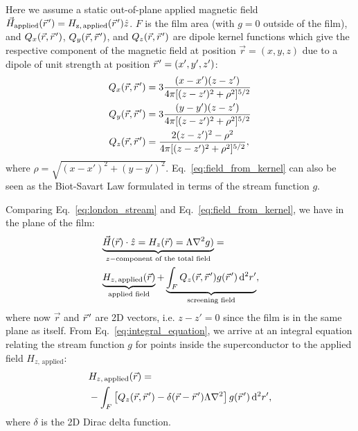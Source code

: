 \documentclass[final,3p,times,twocolumn]{elsarticle}
\newcommand{\pvec}[1]{\vec{#1}\mkern2mu\vphantom{#1}}
\newcounter{bla}
\begin{document}
Here we assume a static out-of-plane applied magnetic field $\vec{H}_\mathrm{applied}(\pvec{r}')=H_\mathrm{z,\,\mathrm{applied}}(\pvec{r}')\hat{z}$. $F$ is the film area (with $g = 0$ outside of the film), and $Q_x(\vec{r},\pvec{r}')$, $Q_y(\vec{r},\pvec{r}')$, and $Q_z(\vec{r},\pvec{r}')$ are dipole kernel functions which give the respective component of the magnetic field at position $\vec{r}=(x, y, z)$ due to a dipole of unit strength at position $\pvec{r}'=(x', y', z')$:
\begin{align}
    \label{eq:kernels}
    \begin{split}
        Q_x(\vec{r}, \pvec{r}') &=  3\frac{(x-x')(z-z')}
        {4\pi[(z-z')^2+\rho^2]^{5/2}}\\
        Q_y(\vec{r}, \pvec{r}') &=  3\frac{(y-y')(z-z')}
        {4\pi[(z-z')^2+\rho^2]^{5/2}}\\
        Q_z(\vec{r}, \pvec{r}') &=  \frac{2(z-z')^2-\rho^2}
        {4\pi[(z-z')^2+\rho^2]^{5/2}},
    \end{split}
\end{align}
where $\rho=\sqrt{(x-x')^2 + (y-y')^2}$. Eq.~\ref{eq:field_from_kernel} can also be seen as the Biot-Savart Law formulated in terms of the stream function $g$.

Comparing Eq.~\ref{eq:london_stream} and Eq.~\ref{eq:field_from_kernel}, we have in the plane of the film:
\begin{align}
    \label{eq:integral_equation}
    \begin{split}
        &\underbrace{\vec{H}(\vec{r})\cdot\hat{z} = H_z(\vec{r})
        = \Lambda\nabla^2g)}_{z-\text{component of the total field}}
        = \\ & \underbrace{H_{z,\,\mathrm{applied}}(\vec{r})}_{\text{applied field}}
        + \underbrace{\int_F Q_z(\vec{r},\pvec{r}')g(\pvec{r}')\,\mathrm{d}^2r'}_{\text{screening field}},
    \end{split}
\end{align}
where now $\vec{r}$ and $\pvec{r}'$ are 2D vectors, i.e. $z-z'=0$ since the film is in the same plane as itself. From Eq.~\ref{eq:integral_equation}, we arrive at an integral equation relating the stream function $g$ for points inside the superconductor to the applied field $H_{z,\,\mathrm{applied}}$:
\begin{align}
\begin{split}
    \label{eq:applied_to_stream}
    &H_{z,\,\mathrm{applied}}(\vec{r})
    = \\ &-\int_F\left[
        Q_z(\vec{r},\pvec{r}')-\delta(\vec{r}-\pvec{r}')\Lambda\nabla^2\right
    ]g(\pvec{r}')\,\mathrm{d}^2r',
\end{split}
\end{align}
where $\delta$ is the 2D Dirac delta function.
\end{document}
